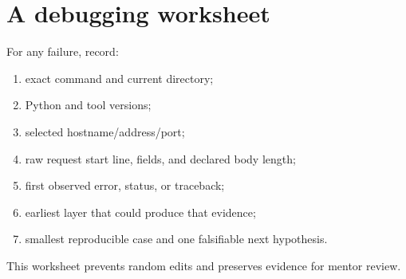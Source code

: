 \section{A debugging worksheet}

For any failure, record:

\begin{enumerate}
  \item exact command and current directory;
  \item Python and tool versions;
  \item selected hostname/address/port;
  \item raw request start line, fields, and declared body length;
  \item first observed error, status, or traceback;
  \item earliest layer that could produce that evidence;
  \item smallest reproducible case and one falsifiable next hypothesis.
\end{enumerate}

This worksheet prevents random edits and preserves evidence for mentor review.
